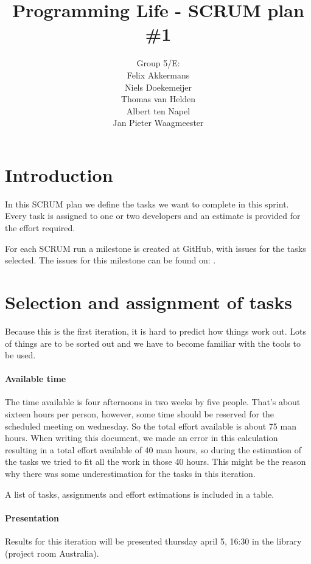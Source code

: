 \documentclass[a4paper]{article}
\title{Programming Life - SCRUM plan \#1}
\author{Group 5/E:\\
Felix Akkermans \\
Niels Doekemeijer \\
Thomas van Helden \\
Albert ten Napel \\
Jan Pieter Waagmeester}
\begin{document}
\maketitle

\section{Introduction}
In this SCRUM plan we define the tasks we want to complete in this sprint. Every task is assigned to one or two developers and an estimate is provided for the effort required.

For each SCRUM run a milestone is created at GitHub, with issues for the tasks selected. The issues for this milestone can be found on: .

\section{Selection and assignment of tasks}
Because this is the first iteration, it is hard to predict how things work out. Lots of things are to be sorted out and we have to become familiar with the tools to be used.

\paragraph{Available time}
The time available is four afternoons in two weeks by five people. That's about sixteen hours per person, however, some time should be reserved for the scheduled meeting on wednesday. So the total effort available is about 75 man hours. When writing this document, we made an error in this calculation resulting in a total effort available of 40 man hours, so during the estimation of the tasks we tried to fit all the work in those 40 hours. This might be the reason why there was some underestimation for the tasks in this iteration.

A list of tasks, assignments and effort estimations is included in a table.


\paragraph{Presentation}
Results for this iteration will be presented thursday april 5, 16:30 in the library (project room Australia).
\end{document}
